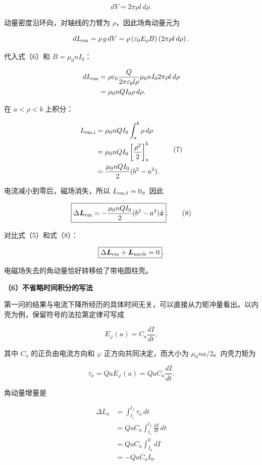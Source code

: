 \documentclass[12pt,a4paper,UTF8]{ctexart}
\begin{document}
\[
dV=2\pi\rho l\,d\rho.
\]

动量密度沿环向，对轴线的力臂为 \(\rho\)，因此场角动量元为

\[
dL_{\rm em}
=\rho\,g\,dV
=\rho\left(\varepsilon_0E_\rho B\right)
\left(2\pi\rho l\,d\rho\right).
\]

代入式（6）和 \(B=\mu_0nI_0\)：

\[
\begin{aligned}
dL_{\rm em}
&=\rho\varepsilon_0
\frac{Q}{2\pi\varepsilon_0l\rho}
\mu_0nI_0
2\pi\rho l\,d\rho\\
&=\mu_0nQI_0\rho\,d\rho.
\end{aligned}
\]

在 \(a<\rho<b\) 上积分：

\[
\begin{aligned}
L_{\rm em,i}
&=\mu_0nQI_0\int_a^b\rho\,d\rho\\
&=\mu_0nQI_0\left[\frac{\rho^2}{2}\right]_a^b\\
&=\frac{\mu_0nQI_0}{2}(b^2-a^2).
\end{aligned}\tag{7}
\]

电流减小到零后，磁场消失，所以 \(L_{\rm em,f}=0\)。因此

\[
\boxed{
\Delta\bm L_{\rm em}
=-\frac{\mu_0nQI_0}{2}(b^2-a^2)\hat{\bm z}
}.\tag{8}
\]

对比式（5）和式（8）：

\[
\boxed{
\Delta\bm L_{\rm em}+\bm L_{\rm mech}=0
}.
\]

电磁场失去的角动量恰好转移给了带电圆柱壳。

\textbf{（6）不省略时间积分的写法}

第一问的结果与电流下降所经历的具体时间无关，可以直接从力矩冲量看出。以内壳为例，保留符号的法拉第定律可写成

\[
E_\varphi(a)=C_a\frac{dI}{dt},
\]

其中 \(C_a\) 的正负由电流方向和 \(\varphi\) 正方向共同决定，而大小为
\(\mu_0na/2\)。内壳力矩为

\[
\tau_a=QaE_\varphi(a)
=QaC_a\frac{dI}{dt}.
\]

角动量增量是

\[
\begin{aligned}
\Delta L_a
&=\int_{t_i}^{t_f}\tau_a\,dt\\
&=QaC_a\int_{t_i}^{t_f}\frac{dI}{dt}\,dt\\
&=QaC_a\int_{I_0}^{0}dI\\
&=-QaC_aI_0.
\end{aligned}
\tag{9}
\]
\end{document}
